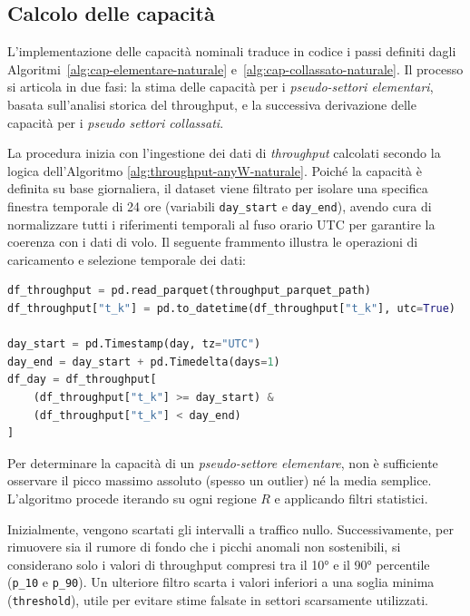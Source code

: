 \clearpage
\subsection{Calcolo delle capacità}
L'implementazione delle capacità nominali traduce in codice i passi definiti dagli Algoritmi~\ref{alg:cap-elementare-naturale} e~\ref{alg:cap-collassato-naturale}. Il processo si articola in due fasi: la stima delle capacità per i \emph{pseudo-settori elementari}, basata sull'analisi storica del throughput, e la successiva derivazione delle capacità per i \emph{pseudo settori collassati}.

La procedura inizia con l'ingestione dei dati di \emph{throughput} calcolati secondo la logica dell'Algoritmo \ref{alg:throughput-anyW-naturale}. Poiché la capacità è definita su base giornaliera, il dataset viene filtrato per isolare una specifica finestra temporale di 24 ore (variabili \texttt{day\_start} e \texttt{day\_end}), avendo cura di normalizzare tutti i riferimenti temporali al fuso orario UTC per garantire la coerenza con i dati di volo. Il seguente frammento illustra le operazioni di caricamento e selezione temporale dei dati:
\begin{lstlisting}[language=Python, caption={}]
df_throughput = pd.read_parquet(throughput_parquet_path)
df_throughput["t_k"] = pd.to_datetime(df_throughput["t_k"], utc=True)

day_start = pd.Timestamp(day, tz="UTC")
day_end = day_start + pd.Timedelta(days=1)
df_day = df_throughput[
    (df_throughput["t_k"] >= day_start) & 
    (df_throughput["t_k"] < day_end)
]
\end{lstlisting}
Per determinare la capacità di un \emph{pseudo-settore elementare}, non è sufficiente osservare il picco massimo assoluto (spesso un outlier) né la media semplice. L'algoritmo procede iterando su ogni regione $R$ e applicando filtri statistici.

Inizialmente, vengono scartati gli intervalli a traffico nullo. Successivamente, per rimuovere sia il rumore di fondo che i picchi anomali non sostenibili, si considerano solo i valori di throughput compresi tra il 10° e il 90° percentile (\texttt{p\_10} e \texttt{p\_90}). Un ulteriore filtro scarta i valori inferiori a una soglia minima (\texttt{threshold}), utile per evitare stime falsate in settori scarsamente utilizzati.

